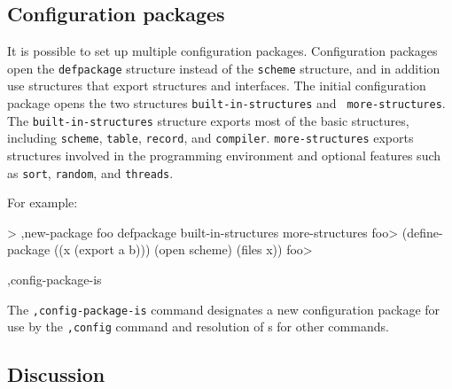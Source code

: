 \subsection*{Configuration packages}

It is possible to set up multiple configuration packages.
Configuration packages open the {\tt defpackage} structure instead of
the {\tt scheme} structure, and in addition use structures that export
structures and interfaces.  The initial configuration package opens
the two structures {\tt built-in-structures} and {\tt
more-structures}.  The {\tt built-in-structures} structure exports
most of the basic structures, including {\tt scheme}, {\tt table},
{\tt record}, and {\tt compiler}.  {\tt more-structures} exports
structures involved in the programming environment and optional
features such as {\tt sort}, {\tt random}, and {\tt threads}.

For example:
\begin{code}
    > ,new-package foo defpackage built-in-structures more-structures
    foo> (define-package ((x (export a b)))
           (open scheme)
	   (files x))
    foo> 
\end{code}


\begin{list}{}{}{}
\item
\begin{code}
,config-package-is 
\end{code}
    The {\tt,config-package-is} command designates a new configuration
    package for use by the {\tt,config} command and resolution of
    s for other commands.
\end{list}




\subsection*{Discussion}

